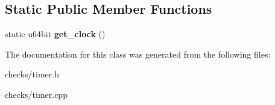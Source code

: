 \subsection*{Static Public Member Functions}
\begin{DoxyCompactItemize}
\item 
\hypertarget{classTimer_a1fbdf0048666eb22a6d8e935dee7847a}{static u64bit {\bfseries get\-\_\-clock} ()}\label{classTimer_a1fbdf0048666eb22a6d8e935dee7847a}

\end{DoxyCompactItemize}


The documentation for this class was generated from the following files\-:\begin{DoxyCompactItemize}
\item 
checks/timer.\-h\item 
checks/timer.\-cpp\end{DoxyCompactItemize}
